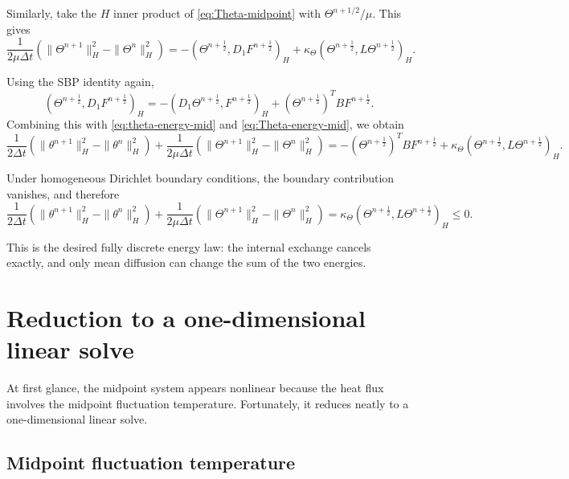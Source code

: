 \documentclass[11pt]{article}
\begin{document}
Similarly, take the $H$ inner product of \eqref{eq:Theta-midpoint} with $\Theta^{n+1/2}/\mu$. This gives
\begin{equation}
\frac{1}{2\mu\Delta t}
\left(
\|\Theta^{n+1}\|_H^2 - \|\Theta^n\|_H^2
\right)
=
-
(\Theta^{n+\frac12},D_1F^{n+\frac12})_H
+
\kappa_\Theta
(\Theta^{n+\frac12},L\Theta^{n+\frac12})_H.
\label{eq:Theta-energy-mid}
\end{equation}

Using the SBP identity again,
\[
(\Theta^{n+\frac12},D_1F^{n+\frac12})_H
=
-
(D_1\Theta^{n+\frac12},F^{n+\frac12})_H
+
(\Theta^{n+\frac12})^T B F^{n+\frac12}.
\]
Combining this with \eqref{eq:theta-energy-mid} and \eqref{eq:Theta-energy-mid}, we obtain
\begin{equation}
\frac{1}{2\Delta t}
\left(
\|\theta^{n+1}\|_H^2 - \|\theta^n\|_H^2
\right)
+
\frac{1}{2\mu\Delta t}
\left(
\|\Theta^{n+1}\|_H^2 - \|\Theta^n\|_H^2
\right)
=
-
(\Theta^{n+\frac12})^T B F^{n+\frac12}
+
\kappa_\Theta
(\Theta^{n+\frac12},L\Theta^{n+\frac12})_H.
\label{eq:full-discrete-balance-prebc}
\end{equation}

Under homogeneous Dirichlet boundary conditions, the boundary contribution vanishes, and therefore
\begin{equation}
\frac{1}{2\Delta t}
\left(
\|\theta^{n+1}\|_H^2 - \|\theta^n\|_H^2
\right)
+
\frac{1}{2\mu\Delta t}
\left(
\|\Theta^{n+1}\|_H^2 - \|\Theta^n\|_H^2
\right)
=
\kappa_\Theta
(\Theta^{n+\frac12},L\Theta^{n+\frac12})_H
\le 0.
\label{eq:full-discrete-balance}
\end{equation}

This is the desired fully discrete energy law: the internal exchange cancels exactly, and only mean diffusion can change the sum of the two energies.

\section{Reduction to a one-dimensional linear solve}

At first glance, the midpoint system appears nonlinear because the heat flux involves the midpoint fluctuation temperature. Fortunately, it reduces neatly to a one-dimensional linear solve.

\subsection{Midpoint fluctuation temperature}
\end{document}
